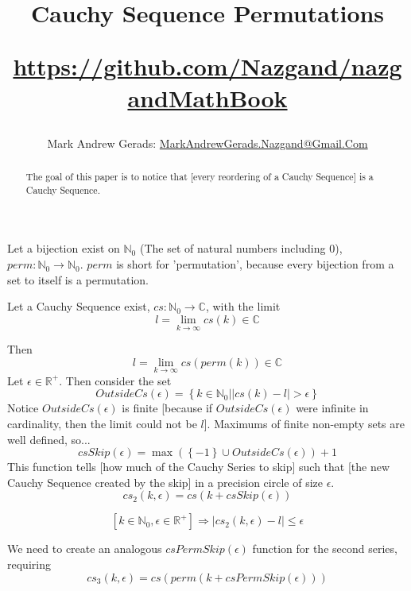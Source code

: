 \documentclass[]{article}
\author{Mark Andrew Gerads: \href{MailTo:MarkAndrewGerads.Nazgand@Gmail.Com}{MarkAndrewGerads.Nazgand@Gmail.Com}}
\title{
	Cauchy Sequence Permutations
	
	\href{https://github.com/Nazgand/nazgandMathBook}{https://github.com/Nazgand/nazgandMathBook}
}
\newcommand{\pqty}[1]{{\left(#1\right)}}
\newcommand{\Bqty}[1]{{\left\{#1\right\}}}
\newcommand{\bqty}[1]{{\left[#1\right]}}
\newcommand{\abs}[1]{{\left\lvert#1\right\rvert}}
\numberwithin{equation}{section}
\begin{document}
	
	\maketitle
	
	\begin{abstract}
		The goal of this paper is to notice that [every reordering of a Cauchy Sequence] is a Cauchy Sequence.
	\end{abstract}
	
	Let a bijection exist on $\mathbb{N}_0$ (The set of natural numbers including 0), $perm:\mathbb{N}_0\to\mathbb{N}_0$. $perm$ is short for 'permutation', because every bijection from a set to itself is a permutation.
	
	Let a Cauchy Sequence exist, $cs:\mathbb{N}_0\to\mathbb{C}$, with the limit
	\begin{equation}
		l=\lim\limits_{k\to\infty}cs\pqty{k}\in\mathbb{C}
	\end{equation}

	Then
	\begin{equation}
		l=\lim\limits_{k\to\infty}cs\pqty{perm\pqty{k}}\in\mathbb{C}
	\end{equation}
	Let $\epsilon\in\mathbb{R}^+$. Then consider the set
	\begin{equation}
		OutsideCs\pqty{\epsilon}=\Bqty{k\in\mathbb{N}_0|\abs{cs\pqty{k}-l}>\epsilon}
	\end{equation}
	Notice $OutsideCs\pqty{\epsilon}$ is finite [because if $OutsideCs\pqty{\epsilon}$ were infinite in cardinality, then the limit could not be $l$]. Maximums of finite non-empty sets are well defined, so...
	\begin{equation}
		csSkip\pqty{\epsilon}=\max\pqty{\Bqty{-1}\cup OutsideCs\pqty{\epsilon}}+1
	\end{equation}
	This function tells [how much of the Cauchy Series to skip] such that [the new Cauchy Sequence created by the skip] in a precision circle of size $\epsilon$.
	\begin{equation}
		cs_2\pqty{k,\epsilon}=cs\pqty{k+csSkip\pqty{\epsilon}}
	\end{equation}
	
	\begin{equation}
		\bqty{k\in\mathbb{N}_0,\epsilon\in\mathbb{R}^+}\Rightarrow \abs{cs_2\pqty{k,\epsilon}-l}\leq\epsilon
	\end{equation}

	We need to create an analogous $csPermSkip\pqty{\epsilon}$ function for the second series, requiring
	\begin{equation}
		cs_3\pqty{k,\epsilon}=cs\pqty{perm\pqty{k+csPermSkip\pqty{\epsilon}}}
	\end{equation}
	
\end{document}
